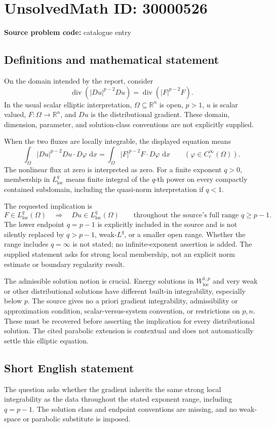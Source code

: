 \documentclass[11pt]{article}
\newcommand{\R}{\mathbb{R}}
\newcommand{\dd}{\,\mathrm{d}}
\begin{document}
\section*{UnsolvedMath ID: 30000526}
\textbf{Source problem code:} catalogue entry
\subsection{Definitions and mathematical statement}
On the domain intended by the report, consider
\[
 \operatorname{div}(|Du|^{p-2}Du)
     =\operatorname{div}(|F|^{p-2}F).
\]
In the usual scalar elliptic interpretation, $\Omega\subseteq\R^n$ is open, $p>1$, $u$ is scalar valued, $F:\Omega\to\R^n$, and $Du$ is the distributional gradient. These domain, dimension, parameter, and solution-class conventions are not explicitly supplied.

When the two fluxes are locally integrable, the displayed equation means
\[
 \int_\Omega |Du|^{p-2}Du\cdot D\varphi\,\dd x
  =\int_\Omega |F|^{p-2}F\cdot D\varphi\,\dd x
 \qquad(\varphi\in C_c^\infty(\Omega)).
\]
The nonlinear flux at zero is interpreted as zero. For a finite exponent $q>0$, membership in $L^q_{\mathrm{loc}}$ means finite integral of the $q$-th power on every compactly contained subdomain, including the quasi-norm interpretation if $q<1$.

The requested implication is
\[
 F\in L^q_{\mathrm{loc}}(\Omega)
       \quad\Longrightarrow\quad
 Du\in L^q_{\mathrm{loc}}(\Omega)
 \qquad\text{throughout the source's full range }q\ge p-1.
\]
The lower endpoint $q=p-1$ is explicitly included in the source and is not silently replaced by $q>p-1$, weak-$L^q$, or a smaller open range. Whether the range includes $q=\infty$ is not stated; no infinite-exponent assertion is added. The supplied statement asks for strong local membership, not an explicit norm estimate or boundary regularity result.

The admissible solution notion is crucial. Energy solutions in $W^{1,p}_{\mathrm{loc}}$ and very weak or other distributional solutions have different built-in integrability, especially below $p$. The source gives no a priori gradient integrability, admissibility or approximation condition, scalar-versus-system convention, or restrictions on $p,n$. These must be recovered before asserting the implication for every distributional solution. The cited parabolic extension is contextual and does not automatically settle this elliptic equation.
\subsection{Short English statement}
The question asks whether the gradient inherits the same strong local integrability as the data throughout the stated exponent range, including $q=p-1$. The solution class and endpoint conventions are missing, and no weak-space or parabolic substitute is imposed.
\end{document}

